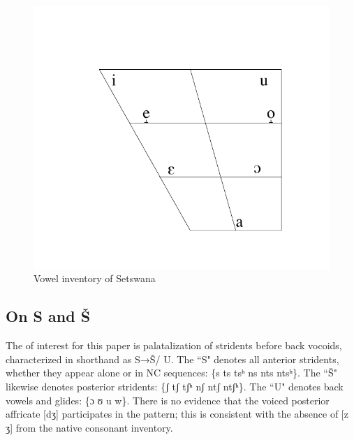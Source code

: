 \documentclass[output=paper,newtxmath,modfonts,nonflat]{langsci/langscibook}
\begin{document}
   
\begin{figure}
\includegraphics[width=1\linewidth]{figures/bennet_vowels.pdf}
\caption{Vowel inventory of Setswana \citep{Bennett2016}}
\label{fig:bennett:1}
\end{figure} 

\subsection{On S and Š}\label{sec:bennett:2.2}

The  of interest for this paper is palatalization of stridents before back vocoids, characterized in shorthand as S→Š/ {\longrule} U. The ``S" denotes all anterior stridents, whether they appear alone or in NC sequences: \{s ts tsʰ ns nts ntsʰ\}. The ``Š" likewise denotes posterior stridents: \{ʃ tʃ tʃʰ nʃ ntʃ ntʃʰ\}. The ``U" denotes back vowels and glides: \{ɔ ʊ u w\}. There is no evidence that the voiced posterior affricate [dʒ] participates in the pattern; this is consistent with the absence of [z ʒ] from the native consonant inventory.
\end{document}
